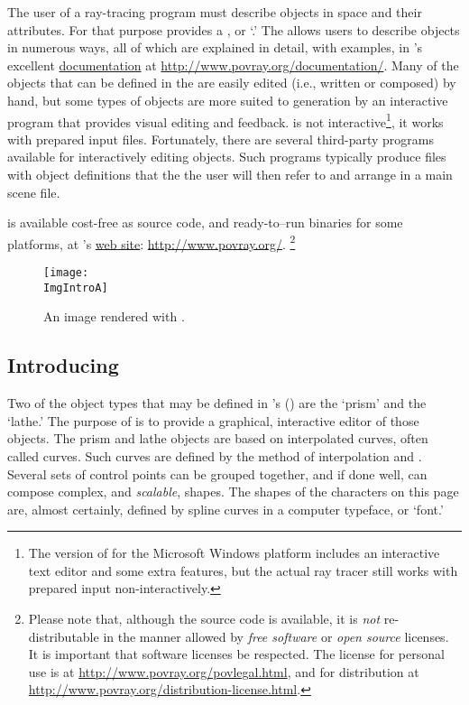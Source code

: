 The user of a ray-tracing program must describe objects in space
and their attributes. For that purpose \IXpov{} provides a
, or `.'
The 
allows users to describe objects in numerous ways, all of which
are explained in detail, with examples, in \IXpov{}'s
excellent \href{http://www.povray.org/documentation/}{documentation}
at \url{http://www.povray.org/documentation/}.
Many of the objects that can be defined in the  are easily
edited (i.e., written or composed) by hand, but some types of objects
are more suited to generation by an interactive program that
provides visual editing and feedback. \IXpov{} is not
interactive\footnote{The version of \IXpov{} for the
Microsoft Windows platform includes an interactive text editor and
some extra features, but the actual ray tracer still works
with prepared input non-interactively.},
it works with prepared input files. Fortunately, there are several
third-party programs available for interactively editing
\IXpov{}  objects. Such programs typically
produce  files with object definitions
that the the user will then refer to and arrange in a main scene file.

\IXpov{} is available cost-free as source code, and
ready-to--run binaries for some platforms, at
\IXpov's \href{http://www.povray.org/}{web site}:
\url{http://www.povray.org/}.
\footnote{Please note that, although the source code is available,
it is \emph{not} re-distributable in the manner allowed
by \emph{free software} or \emph{open source} licenses.
It is important that software licenses be respected.
The \IXpov{} license for personal use is at
\url{http://www.povray.org/povlegal.html}, and for distribution
at \url{http://www.povray.org/distribution-license.html}.}

\begin{figure}[htb]
\centering
\texttt{[image: \\ImgIntroA]}
\caption{An image rendered with \dtypov.}
\label{fig:pov_image_Intro_0}
\end{figure}


	\subsection{Introducing \dtypkgu}
Two of the object types that may be defined in \IXpov's
 ()
are the `prism' and the `lathe.'
The purpose of \IXpkg{} is to provide a graphical,
interactive editor of those objects. The prism and lathe
objects are based on interpolated curves, often called
 curves. Such curves are defined by
the method of interpolation and .
Several sets of control points can be grouped together, and
if done well, can compose complex, and \emph{scalable},
shapes.
The shapes of the characters on this page are, almost certainly,
defined by spline curves in a computer typeface, or `font.'

